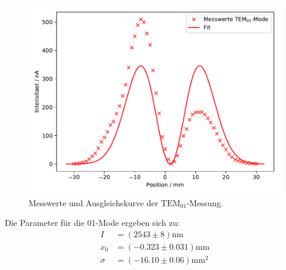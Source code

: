 \begin{figure}[H]
  \centering
  \includegraphics{plots/M01.pdf}
  \caption{Messwerte und Ausgleichskurve der $\text{TEM}_{01}$-Messung.}
  \label{fig:M01}
\end{figure}
Die Parameter für die 01-Mode ergeben sich zu:
\begin{align*}
  I &= (2543 \pm 8)\text{nm}\\
  x_0&=(-0.323 \pm 0.031) \text{mm}\\
  \sigma &= (-16.10 \pm 0.06) \text{mm}^{2}
\end{align*}
